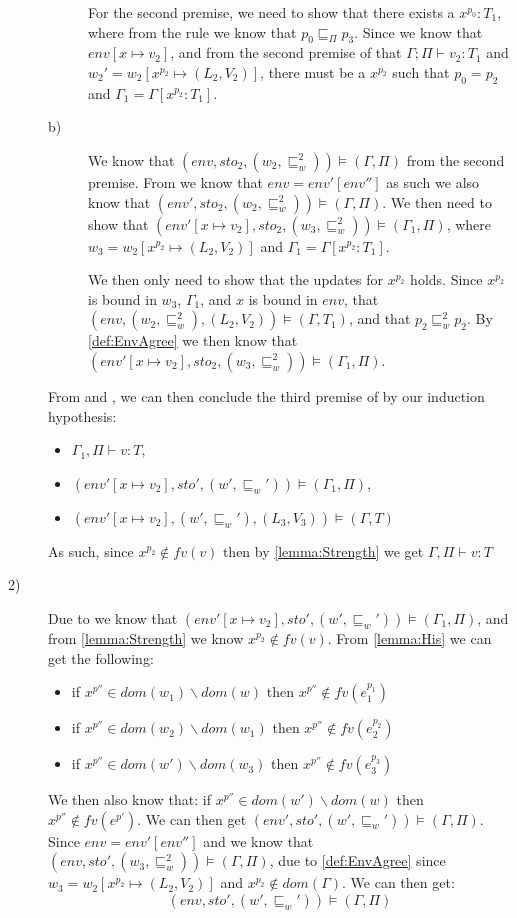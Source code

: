 \begin{description}
\begin{description}
			For the second premise, we need to show that there exists a $x^{p_0}:T_1$, where from the  rule we know that $p_0\sqsubseteq_\Pi p_3$.
			Since we know that $env[x\mapsto v_2]$, and from the second premise of  that $\Gamma;\Pi\vdash v_2:T_1$ and $w_2'=w_2[x^{p_2}\mapsto(L_2,V_2)]$, there must be a $x^{p_2}$ such that $p_0=p_2$ and $\Gamma_1=\Gamma[x^{p_2}:T_1]$.

		\item[b)] We know that $(env,sto_2,(w_2,\sqsubseteq_w^2))\models(\Gamma,\Pi)$ from the second premise.
			From  we know that $env=env'[env'']$ as such we also know that $(env',sto_2,(w_2,\sqsubseteq_w^2))\models(\Gamma,\Pi)$.
			We then need to show that $(env'[x\mapsto v_2],sto_2,(w_3,\sqsubseteq_w^2))\models(\Gamma_1,\Pi)$, where $w_3=w_2[x^{p_2}\mapsto(L_2,V_2)]$ and $\Gamma_1=\Gamma[x^{p_2}:T_1]$.
		
			We then only need to show that the updates for $x^{p_2}$ holds.
			Since $x^{p_2}$ is bound in $w_3$, $\Gamma_1$, and $x$ is bound in $env$, that $(env,(w_2,\sqsubseteq_w^2),(L_2,V_2))\models(\Gamma,T_1)$, and that $p_2 \sqsubseteq_w^2 p_2$.
			By \cref{def:EnvAgree} we then know that $(env'[x\mapsto v_2],sto_2,(w_3,\sqsubseteq_w^2))\models(\Gamma_1,\Pi)$.
	\end{description}
	From  and , we can then conclude the third premise of  by our induction hypothesis:
	\begin{itemize}
		\item $\Gamma_1,\Pi\vdash v:T$,
		\item $(env'[x\mapsto v_2],sto',(w',\sqsubseteq_w'))\models(\Gamma_1,\Pi)$,
		\item $(env'[x\mapsto v_2],(w',\sqsubseteq_w'),(L_3,V_3))\models(\Gamma,T)$
	\end{itemize}
	As such, since $x^{p_2}\notin fv(v)$ then by \cref{lemma:Strength} we get
	$\Gamma,\Pi\vdash v:T$

\item[2)] Due to  we know that $(env'[x\mapsto v_2],sto',(w',\sqsubseteq_w'))\models(\Gamma_1,\Pi)$, and from \cref{lemma:Strength} we know $x^{p_2}\notin fv(v)$.
	From \cref{lemma:His} we can get the following:
	\begin{itemize}
		\item if $x^{p''}\in dom(w_1)\backslash dom(w)$ then $x^{p''}\notin fv(e_1^{p_1})$
		\item if $x^{p''}\in dom(w_2)\backslash dom(w_1)$ then $x^{p''}\notin fv(e_2^{p_2})$
		\item if $x^{p''}\in dom(w')\backslash dom(w_3)$ then $x^{p''}\notin fv(e_3^{p_3})$
	\end{itemize}
	We then also know that: if $x^{p''}\in dom(w')\backslash dom(w)$ then $x^{p''}\notin fv(e^{p'})$.
	We can then get $(env',sto',(w',\sqsubseteq_w'))\models(\Gamma,\Pi)$.
	Since $env=env'[env'']$ and we know that $(env,sto',(w_3,\sqsubseteq_w^2))\models(\Gamma,\Pi)$, due to \cref{def:EnvAgree} since $w_3=w_2[x^{p_2}\mapsto(L_2,V_2)]$ and $x^{p_2}\notin dom(\Gamma)$.
	We can then get:
	$$(env,sto',(w',\sqsubseteq_w'))\models(\Gamma,\Pi)$$


\end{description}
